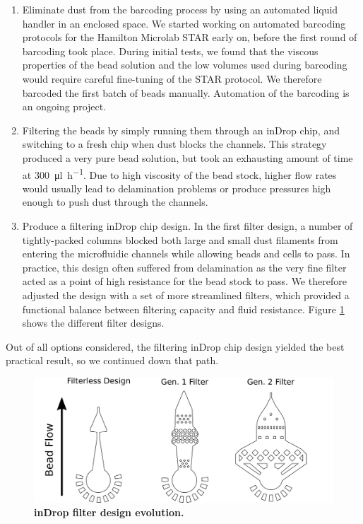 \begin{enumerate}
	\item Eliminate dust from the barcoding process by using an automated liquid handler in an enclosed space. We started working on automated barcoding protocols for the Hamilton Microlab STAR early on, before the first round of barcoding took place. During initial tests, we found that the viscous properties of the bead solution and the low volumes used during barcoding would require careful fine-tuning of the STAR protocol. We therefore barcoded the first batch of beads manually. Automation of the barcoding is an ongoing project.
	\item Filtering the beads by simply running them through an inDrop chip, and switching to a fresh chip when dust blocks the channels. This strategy produced a very pure bead solution, but took an exhausting amount of time at \SI{300}{\ul\per\hour}. Due to high viscosity of the bead stock, higher flow rates would usually lead to delamination problems or produce pressures high enough to push dust through the channels.
	\item Produce a filtering inDrop chip design. In the first filter design, a number of tightly-packed columns blocked both large and small dust filaments from entering the microfluidic channels while allowing beads and cells to pass. In practice, this design often suffered from delamination as the very fine filter acted as a point of high resistance for the bead stock to pass. We therefore adjusted the design with a set of more streamlined filters, which provided a functional balance between filtering capacity and fluid resistance. Figure \ref{fig:indrop_filters} shows the different filter designs.
\end{enumerate}

Out of all options considered, the filtering inDrop chip design yielded the best practical result, so we continued down that path.\pms

\begin{figure}[ht]
\centerfloat
\includegraphics[width=\textwidth]{./ims/indrop_filters.png}
\caption[inDrop Filter Design Evolution]{\textbf{inDrop filter design evolution.}}
\label{fig:indrop_filters}
\end{figure}


